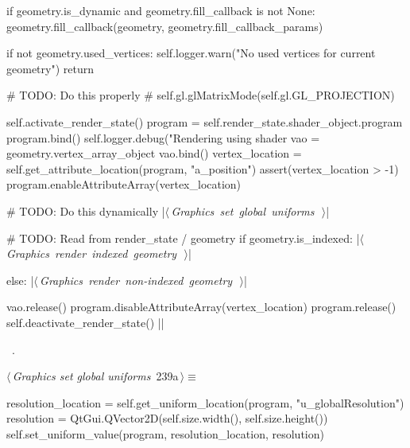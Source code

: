 \documentclass[%
    a4paper,    %
    justified,  %
    nobib,      %
    openany     %
]{tufte-book}
\makeatletter
\renewcommand{\label}[1]{\@tufte@label{##1}}%
\makeatother
\begin{document}
\begin{fullwidth}
\begin{flushleft}
\begin{minipage}{\linewidth}
\begin{pythoncode}
    if geometry.is_dynamic and geometry.fill_callback is not None:
        geometry.fill_callback(geometry, geometry.fill_callback_params)

    if not geometry.used_vertices:
        self.logger.warn("No used vertices for current geometry")
        return

    # TODO: Do this properly
    # self.gl.glMatrixMode(self.gl.GL_PROJECTION)

    self.activate_render_state()
    program = self.render_state.shader_object.program
    program.bind()
    self.logger.debug("Rendering using shader %
    vao = geometry.vertex_array_object
    vao.bind()
    vertex_location = self.get_attribute_location(program, "a_position")
    assert(vertex_location > -1)
    program.enableAttributeArray(vertex_location)

    # TODO: Do this dynamically
    |\hbox{$\langle\,${\itshape Graphics set global uniforms}\nobreak\ {\footnotesize {}}$\,\rangle$}|

    # TODO: Read from render_state / geometry
    if geometry.is_indexed:
        |\hbox{$\langle\,${\itshape Graphics render indexed geometry}\nobreak\ {\footnotesize {}}$\,\rangle$}|

    else:
        |\hbox{$\langle\,${\itshape Graphics render non-indexed geometry}\nobreak\ {\footnotesize {}}$\,\rangle$}|

    vao.release()
    program.disableAttributeArray(vertex_location)
    program.release()
    self.deactivate_render_state()
|\NWsep|
\end{pythoncode}
\vspace{1.5ex}
\footnotesize
\begin{list}{}{\setlength{\itemsep}{-\parsep}\setlength{\itemindent}{-\leftmargin}}
\item \NWtxtMacroRefIn\ .

\item{}
\end{list}
\end{minipage}\vspace{4ex}
\end{flushleft}
\begin{flushleft} \small
\begin{minipage}{\linewidth}\label{scrap256}\raggedright\small
{} $\langle\,${\itshape Graphics set global uniforms}\nobreak\ {\footnotesize {239a}}$\,\rangle\equiv$
\vspace{-1ex}
\begin{pythoncode}
resolution_location = self.get_uniform_location(program, "u_globalResolution")
resolution = QtGui.QVector2D(self.size.width(), self.size.height())
self.set_uniform_value(program, resolution_location, resolution)


\end{pythoncode}
\end{minipage}
\end{flushleft}
\end{fullwidth}
\end{document}
